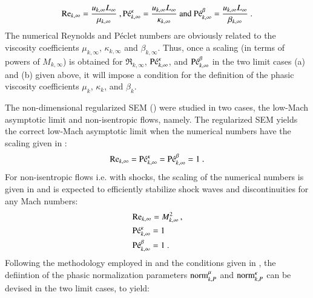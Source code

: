 \documentclass[preprint,10pt]{elsarticle}
\begin{document}
\begin{enumerate}
%
\begin{equation}
\label{eq:ref_numb}
\textrm{Re}_{k,\infty} = \frac{u_{k,\infty} L_\infty}{\mu_{k,\infty}} \ ,
\textrm{P\'e}_{k,\infty}^\kappa = \frac{u_{k,\infty} L_\infty}{\kappa_{k,\infty}} \text{ and }
\textrm{P\'e}_{k,\infty}^\beta = \frac{u_{k,\infty} L_\infty}{\beta_{k,\infty}} \ .
\end{equation}
%
The numerical Reynolds and P\'eclet numbers are obviously related to the 
viscosity coefficients $\mu_{k,\infty}$, $\kappa_{k,\infty}$ and $\beta_{k,\infty}$. Thus, once a scaling (in terms of powers of $M_{k,\infty}$) 
is obtained for $\Re_{k,\infty}$, $\textrm{P\'e}_{k,\infty}^\kappa$, and $\textrm{P\'e}_{k,\infty}^\beta$ in the two limit cases (a) and (b) given above, it will 
impose a condition for the definition of the phasic viscosity coefficients $\mu_k$, $\kappa_k$, and $\beta_k$. 
\end{enumerate} 
The non-dimensional regularized SEM (\cite{Marco_paper_sem}) were studied in two cases, the low-Mach asymptotic limit and non-isentropic flows, namely. The regularized 
SEM yields the correct 
low-Mach asymptotic limit when the numerical numbers have the scaling given in :
%
\begin{equation}\label{eq:isent-flow-num-nb}
\textrm{Re}_{k,\infty} = \textrm{P\'e}_{k,\infty}^\kappa = \textrm{P\'e}_{k,\infty}^\beta =1 \ .
\end{equation}
%
For non-isentropic flows i.e. with shocks, the scaling of the numerical numbers is given in  and is expected to efficiently stabilize shock waves 
and discontinuities for any Mach numbers:
%
\begin{align}\label{eq:non-isent-flow-num-nb}
&\Re_{k,\infty} = M_{k,\infty}^2 \,, \nonumber \\ 
& \Pe_{k,\infty}^\kappa = 
1 \\ %
&\Pe_{k,\infty}^\beta = 1 \ . \nonumber
\end{align}
 
Following the methodology employed in \cite{Marco_paper_low_mach} and the conditions given in , the defiintion of the phasic normalization parameters $\textrm{norm}_{k,P}^\mu$ and $\textrm{norm}_{k,P}^\kappa$ can be devised in the two limit cases, to yield:
\end{document}
